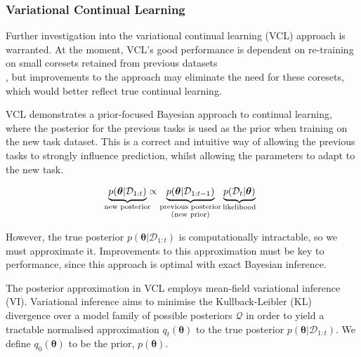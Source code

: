 \documentclass[a4paper,11=0pt]{article}
\let\boldtheta\theta %
\renewcommand{\theta}{\boldsymbol{\boldtheta}} %
\begin{document}
\vspace{-1.25em}
\subsubsection*{Variational Continual Learning}

\vspace{-1em}
Further investigation into the variational continual learning (VCL) approach \cite{vcl} is warranted. At the moment, VCL's good performance is dependent on re-training on small coresets retained from previous datasets \\\cite{robust}, but improvements to the approach may eliminate the need for these coresets, which would better reflect true continual learning. %

VCL demonstrates a prior-focused Bayesian approach to continual learning, where the posterior for the previous tasks is used as the prior when training on the new task dataset. This is a correct and intuitive way of allowing the previous tasks to strongly influence prediction, whilst allowing the parameters to adapt to the new task.%

\vspace{-2em}
\begin{equation}\label{eq:1}
\begin{split}
\underbrace{p(\theta | \mathcal{D}_{1:t})}_{\mathclap{\text{new posterior}}} \propto \underbrace{p(\theta | \mathcal{D}_{1:t-1})}_{\substack{\text{previous posterior}\\ (\text{new prior})}} \underbrace{p(\mathcal{D}_t | \theta)}_{\text{likelihood}}
\end{split}
\end{equation}

\vspace{-0.9em}
However, the true posterior $p(\theta | \mathcal{D}_{1:t})$ is computationally intractable, so we must approximate it. Improvements to this approximation must be key to performance, since this approach is optimal with exact Bayesian inference. %

The posterior approximation in VCL employs mean-field variational inference (VI). Variational inference aims to minimise the Kullback-Leibler (KL) divergence over a model family of possible posteriors $\mathcal{Q}$ in order to yield a tractable normalised approximation $q_t(\theta)$ to the true posterior $p(\theta | \mathcal{D}_{1:t})$. We define $q_0(\theta)$ to be the prior, $p(\theta)$.
\end{document}
